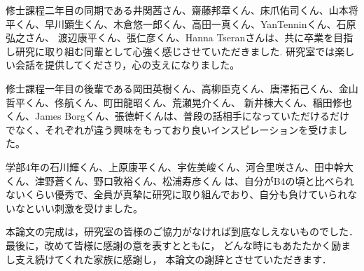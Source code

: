 修士課程二年目の同期である井関茜さん、齋藤邦章くん、床爪佑司くん、山本将平くん、早川顕生くん、木倉悠一郎くん、高田一真くん、YanTenninくん、石原弘之さん、
渡辺康平くん、張仁彦くん、Hanna Tseranさんは、共に卒業を目指し研究に取り組む同輩として心強く感じさせていただきました.
研究室では楽しい会話を提供してくださり，心の支えになりました。

修士課程一年目の後輩である岡田英樹くん、高柳臣克くん、唐澤拓己くん、金山哲平くん、佟航くん、町田龍昭くん、荒瀬晃介くん、
新井棟大くん、稲田修也くん、James Borgくん、張徳軒くんは、普段の話相手になっていただけるだけでなく、それぞれが違う興味をもっており良いインスピレーションを受けました。

学部4年の石川輝くん、上原康平くん、宇佐美峻くん、河合里咲さん、田中幹大くん、津野蒼くん、野口敦裕くん、松浦寿彦くん
は、自分がB4の頃と比べられないくらい優秀で、全員が真摯に研究に取り組んでおり、自分も負けていられないなといい刺激を受けました。

本論文の完成は，研究室の皆様のご協力がなければ到底なしえないものでした．
最後に，改めて皆様に感謝の意を表すとともに，
どんな時にもあたたかく励まし支え続けてくれた家族に感謝し，
本論文の謝辞とさせていただきます．


